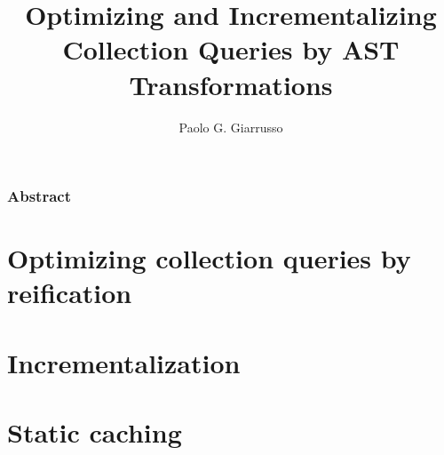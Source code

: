 \documentclass{book}
\title{Optimizing and Incrementalizing Collection Queries by AST Transformations}
\author{Paolo G. Giarrusso}
\begin{document}
\maketitle


\section*{Abstract}

\tableofcontents

\listoffigures
\listoftables



\part{Optimizing collection queries by reification}
\label{part:ch-aosd13}





\part{Incrementalization}
\label{part:incr}






%
%

%

%



% 
% 

\begin{oldSec}

\end{oldSec}

\begin{oldSec}

\end{oldSec}

\part{Static caching}
\label{part:static}



\end{document}
